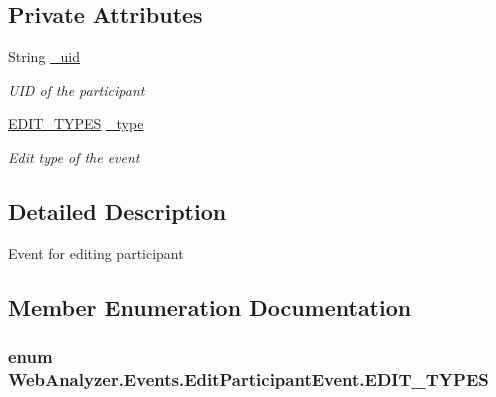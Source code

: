 \subsection*{Private Attributes}
\begin{DoxyCompactItemize}
\item 
String \hyperlink{class_web_analyzer_1_1_events_1_1_edit_participant_event_a83110c23b64e39448d037e55486712b4}{\+\_\+uid}
\begin{DoxyCompactList}\small\item\em U\+I\+D of the participant \end{DoxyCompactList}\item 
\hyperlink{class_web_analyzer_1_1_events_1_1_edit_participant_event_a72647511d8ac40197121e93d14913a1a}{E\+D\+I\+T\+\_\+\+T\+Y\+P\+E\+S} \hyperlink{class_web_analyzer_1_1_events_1_1_edit_participant_event_abe6fa80e6542cba6fbd7483ecffd154f}{\+\_\+type}
\begin{DoxyCompactList}\small\item\em Edit type of the event \end{DoxyCompactList}\end{DoxyCompactItemize}


\subsection{Detailed Description}
Event for editing participant 



\subsection{Member Enumeration Documentation}
\hypertarget{class_web_analyzer_1_1_events_1_1_edit_participant_event_a72647511d8ac40197121e93d14913a1a}{}
\subsubsection[{E\+D\+I\+T\+\_\+\+T\+Y\+P\+E\+S}]{\setlength{\rightskip}{0pt plus 5cm}enum {\bf Web\+Analyzer.\+Events.\+Edit\+Participant\+Event.\+E\+D\+I\+T\+\_\+\+T\+Y\+P\+E\+S}\hspace{0.3cm}{\ttfamily [strong]}}\label{class_web_analyzer_1_1_events_1_1_edit_participant_event_a72647511d8ac40197121e93d14913a1a}


